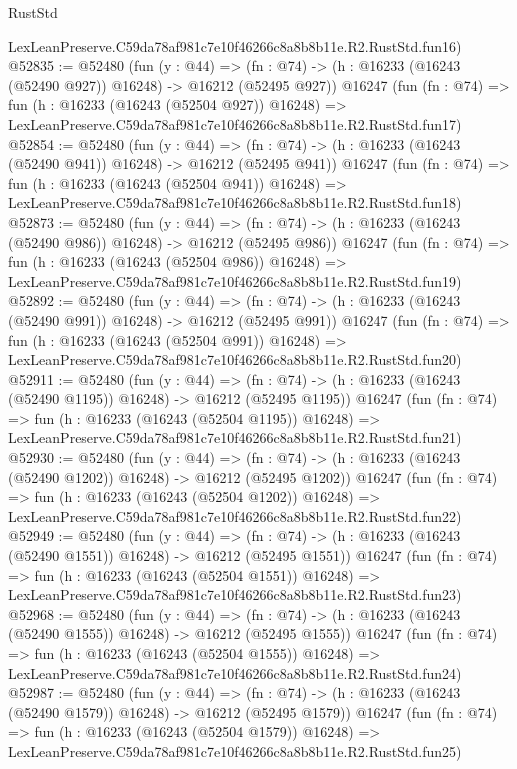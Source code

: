 \begin{lexlean}{RustStd}
\begin{coremodule}
    LexLeanPreserve.C59da78af981c7e10f46266c8a8b8b11e.R2.RustStd.fun16)
@52835 := @52480
    (fun (y : @44) =>
    (fn : @74) -> (h : @16233 (@16243 (@52490 @927)) @16248) -> @16212 (@52495 @927))
    @16247
    (fun (fn : @74) =>
    fun (h : @16233 (@16243 (@52504 @927)) @16248) =>
    LexLeanPreserve.C59da78af981c7e10f46266c8a8b8b11e.R2.RustStd.fun17)
@52854 := @52480
    (fun (y : @44) =>
    (fn : @74) -> (h : @16233 (@16243 (@52490 @941)) @16248) -> @16212 (@52495 @941))
    @16247
    (fun (fn : @74) =>
    fun (h : @16233 (@16243 (@52504 @941)) @16248) =>
    LexLeanPreserve.C59da78af981c7e10f46266c8a8b8b11e.R2.RustStd.fun18)
@52873 := @52480
    (fun (y : @44) =>
    (fn : @74) -> (h : @16233 (@16243 (@52490 @986)) @16248) -> @16212 (@52495 @986))
    @16247
    (fun (fn : @74) =>
    fun (h : @16233 (@16243 (@52504 @986)) @16248) =>
    LexLeanPreserve.C59da78af981c7e10f46266c8a8b8b11e.R2.RustStd.fun19)
@52892 := @52480
    (fun (y : @44) =>
    (fn : @74) -> (h : @16233 (@16243 (@52490 @991)) @16248) -> @16212 (@52495 @991))
    @16247
    (fun (fn : @74) =>
    fun (h : @16233 (@16243 (@52504 @991)) @16248) =>
    LexLeanPreserve.C59da78af981c7e10f46266c8a8b8b11e.R2.RustStd.fun20)
@52911 := @52480
    (fun (y : @44) =>
    (fn : @74) -> (h : @16233 (@16243 (@52490 @1195)) @16248) -> @16212 (@52495 @1195))
    @16247
    (fun (fn : @74) =>
    fun (h : @16233 (@16243 (@52504 @1195)) @16248) =>
    LexLeanPreserve.C59da78af981c7e10f46266c8a8b8b11e.R2.RustStd.fun21)
@52930 := @52480
    (fun (y : @44) =>
    (fn : @74) -> (h : @16233 (@16243 (@52490 @1202)) @16248) -> @16212 (@52495 @1202))
    @16247
    (fun (fn : @74) =>
    fun (h : @16233 (@16243 (@52504 @1202)) @16248) =>
    LexLeanPreserve.C59da78af981c7e10f46266c8a8b8b11e.R2.RustStd.fun22)
@52949 := @52480
    (fun (y : @44) =>
    (fn : @74) -> (h : @16233 (@16243 (@52490 @1551)) @16248) -> @16212 (@52495 @1551))
    @16247
    (fun (fn : @74) =>
    fun (h : @16233 (@16243 (@52504 @1551)) @16248) =>
    LexLeanPreserve.C59da78af981c7e10f46266c8a8b8b11e.R2.RustStd.fun23)
@52968 := @52480
    (fun (y : @44) =>
    (fn : @74) -> (h : @16233 (@16243 (@52490 @1555)) @16248) -> @16212 (@52495 @1555))
    @16247
    (fun (fn : @74) =>
    fun (h : @16233 (@16243 (@52504 @1555)) @16248) =>
    LexLeanPreserve.C59da78af981c7e10f46266c8a8b8b11e.R2.RustStd.fun24)
@52987 := @52480
    (fun (y : @44) =>
    (fn : @74) -> (h : @16233 (@16243 (@52490 @1579)) @16248) -> @16212 (@52495 @1579))
    @16247
    (fun (fn : @74) =>
    fun (h : @16233 (@16243 (@52504 @1579)) @16248) =>
    LexLeanPreserve.C59da78af981c7e10f46266c8a8b8b11e.R2.RustStd.fun25)

\end{coremodule}
\end{lexlean}
